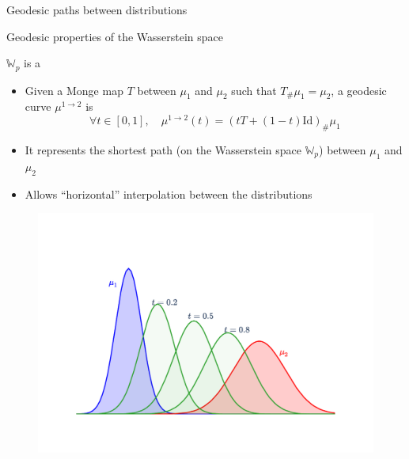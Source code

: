 \documentclass[pdf,aspectratio=169,10pt]{beamer}
\begin{document}
\begin{frame}{Geodesic paths between distributions}
\vspace{2em}
        \small
{}
\end{frame}

\begin{frame}{Geodesic properties of the Wasserstein space}
    \begin{minipage}{0.59\textwidth}
    $\mathbb{W}_p$ is a 
    \begin{itemize}
        \item Given a Monge map $T$ between $\mu_1$ and $\mu_2$ such that $T_{\#}\mu_1 = \mu_2$, a geodesic curve $\mu^{1\to 2}$ is
        \begin{equation*}
\forall t \in [0,1],\quad \mu^{1\to 2}(t) = {(t T + (1-t)\text{Id})}_{\#} \mu_1
        \end{equation*} 
        \item It represents the shortest path (on the Wasserstein space $\mathbb{W}_p$) between $\mu_1$ and $\mu_2$
        \item Allows ``horizontal'' interpolation between the distributions
    \end{itemize}
\end{minipage}
\hfill
\begin{minipage}{0.4\textwidth}
    \begin{figure}
        \centering
            \includegraphics[trim={2cm 2cm 2cm 2cm},clip, width=1\textwidth]{../img/geodesic_1d.pdf}
        \end{figure}
\end{minipage}

\vspace{2em}
        \small
{}
\end{frame}
\end{document}
